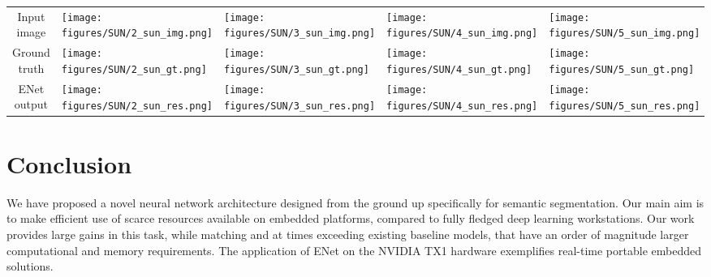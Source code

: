 \documentclass{article}
\begin{document}
\begin{table}[!htb]
  \begin{adjustbox}{width=1.0\textwidth,center}
    \small
    \begin{tabular}{CMMMM}
      Input image
      &\texttt{[image: figures/SUN/2\_sun\_img.png]}
      &\texttt{[image: figures/SUN/3\_sun\_img.png]}
      &\texttt{[image: figures/SUN/4\_sun\_img.png]}
      &\texttt{[image: figures/SUN/5\_sun\_img.png]}
      \\
      Ground truth
      &\texttt{[image: figures/SUN/2\_sun\_gt.png]}
      &\texttt{[image: figures/SUN/3\_sun\_gt.png]}
      &\texttt{[image: figures/SUN/4\_sun\_gt.png]}
      &\texttt{[image: figures/SUN/5\_sun\_gt.png]}
      \\
      ENet output
      &\texttt{[image: figures/SUN/2\_sun\_res.png]}
      &\texttt{[image: figures/SUN/3\_sun\_res.png]}
      &\texttt{[image: figures/SUN/4\_sun\_res.png]}
      &\texttt{[image: figures/SUN/5\_sun\_res.png]}
      \\
    \end{tabular}
  \end{adjustbox}
  \vspace{0.05in}
  \label{fig:sun}
\end{table}

\section{Conclusion} \label{conclusion}

We have proposed a novel neural network architecture designed from the ground up specifically for semantic segmentation.
Our main aim is to make efficient use of scarce resources available on embedded platforms, compared to fully fledged deep learning workstations.
Our work provides large gains in this task, while matching and at times exceeding existing baseline models, that have an order of magnitude larger computational and memory requirements.
The application of ENet on the NVIDIA TX1 hardware exemplifies real-time portable embedded solutions.
\end{document}
